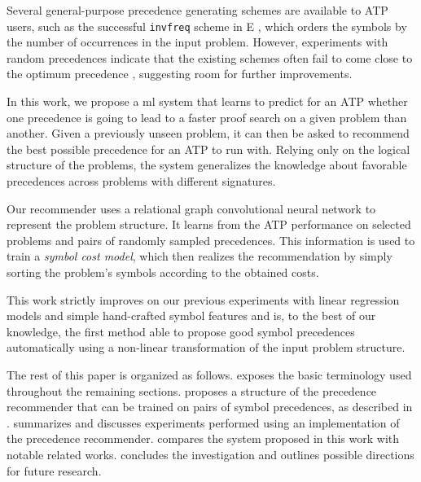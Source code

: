 
Several general-purpose precedence generating schemes are available to ATP users,
such as the successful \texttt{invfreq} scheme in E \cite{E-manual}, which orders the symbols 
by the number of occurrences in the input problem. However, experiments with random precedences
indicate that the existing schemes often fail to come close to the optimum precedence \cite{RegerSuda2017},
suggesting room for further improvements.

In this work, we propose a \acrlong{ml} system that learns to predict for an ATP
whether one precedence is going to lead to a faster proof search on a given problem than another.
Given a previously unseen problem, it can then be asked to recommend the best possible precedence for an ATP to run with.
Relying only on the logical structure of the problems, %
the system generalizes the knowledge about favorable precedences across problems with different signatures.

Our recommender uses a relational graph convolutional neural network \cite{Schlichtkrull2017}
to represent the problem structure. It learns from the ATP performance on selected problems
and pairs of randomly sampled precedences. This information is used to train
a \emph{symbol cost model}, which then realizes the recommendation by simply sorting 
the problem's symbols according to the obtained costs. 

This work strictly improves on our previous experiments with linear regression models and simple hand-crafted symbol features \cite{DBLP:conf/cade/Bartek020}
and is, to the best of our knowledge, the first method able to propose good symbol precedences automatically 
using a non-linear transformation of the input problem structure.

The rest of this paper is organized as follows.
 exposes the basic terminology used throughout the remaining sections.
 proposes a structure of the precedence recommender that can be trained on pairs of symbol precedences,
as described in .
 summarizes and discusses experiments performed
using an implementation of the precedence recommender.
 compares the system proposed in this work with notable related works.
 concludes the investigation and outlines possible directions for future research.

